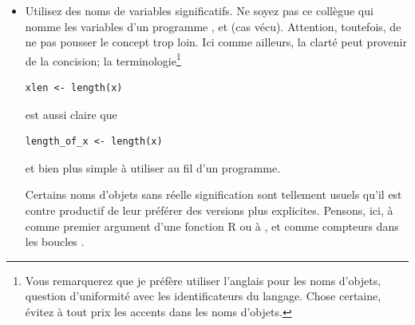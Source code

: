 \begin{itemize}
\item Utilisez des noms de variables significatifs. Ne soyez pas ce
  collègue qui nomme les variables d'un programme , 
  et  (cas vécu). Attention, toutefois, de ne pas pousser le
  concept trop loin. Ici comme ailleurs, la clarté peut provenir de la
  concision; la terminologie\footnote{%
    Vous remarquerez que je préfère utiliser l'anglais pour les
    noms d'objets, question d'uniformité avec les identificateurs du
    langage. Chose certaine, évitez à tout prix les accents dans les
    noms d'objets.}
  \begin{Schunk}
\begin{Verbatim}
xlen <- length(x)
\end{Verbatim}
  \end{Schunk}
  est aussi claire que
  \begin{Schunk}
\begin{Verbatim}
length_of_x <- length(x)
\end{Verbatim}
  \end{Schunk}
  et bien plus simple à utiliser au fil d'un programme.

  Certains noms d'objets sans réelle signification sont tellement
  usuels qu'il est contre productif de leur préférer des versions plus
  explicites. Pensons, ici, à  comme premier argument d'une
  fonction R ou à ,  et  comme compteurs dans
  les boucles .


\end{itemize}
